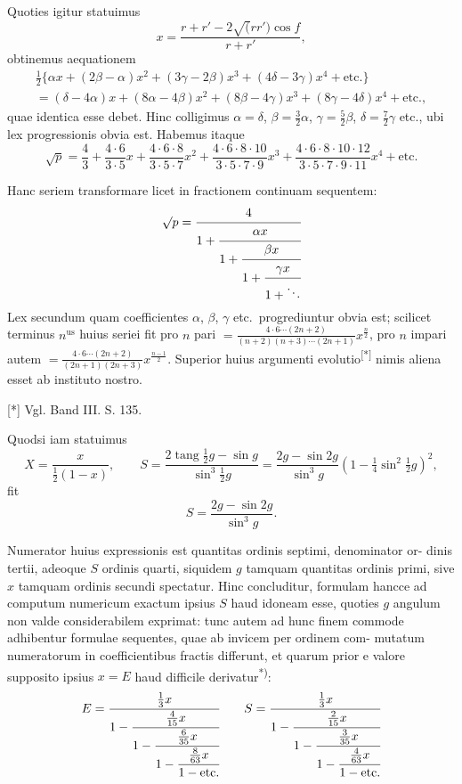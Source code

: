 \documentclass[12pt,a4paper]{article}
\newcommand{\tang}{\mathop{\mathrm{tang}}\nolimits}
\begin{document}
Quoties igitur statuimus
\[
x = \frac{r + r' - 2\surd(rr')\cos f}{r + r'},
\]
obtinemus aequationem
\begin{multline*}
\tfrac{1}{2}\{\alpha x + (2\beta - \alpha)x^2 + (3\gamma - 2\beta)x^3 + (4\delta - 3\gamma)x^4 + \text{etc.}\} \\
= (\delta - 4\alpha)x + (8\alpha - 4\beta)x^2 + (8\beta - 4\gamma)x^3 + (8\gamma - 4\delta)x^4 + \text{etc.},
\end{multline*}
quae identica esse debet. Hinc colligimus $\alpha = \delta$, $\beta = \frac{3}{2}\alpha$, $\gamma = \frac{5}{2}\beta$,
$\delta = \frac{7}{2}\gamma$ etc., ubi lex progressionis obvia est. Habemus itaque
\[
\surd p = \frac{4}{3} + \frac{4\cdot 6}{3\cdot 5}x + \frac{4\cdot 6\cdot 8}{3\cdot 5\cdot 7}x^2 + \frac{4\cdot 6\cdot 8\cdot 10}{3\cdot 5\cdot 7\cdot 9}x^3 + \frac{4\cdot 6\cdot 8\cdot 10\cdot 12}{3\cdot 5\cdot 7\cdot 9\cdot 11}x^4 + \text{etc.}
\]

Hanc seriem transformare licet in fractionem continuam sequentem:
\[
\surd p = \cfrac{4}{1 + \cfrac{\alpha x}{1 + \cfrac{\beta x}{1 + \cfrac{\gamma x}{1 + \ddots}}}}
\]
Lex secundum quam coefficientes $\alpha$, $\beta$, $\gamma$ etc.~progrediuntur obvia est;
scilicet terminus $n^{\text{us}}$ huius seriei fit pro $n$ pari $= \frac{4\cdot 6\cdots (2n + 2)}{(n + 2)(n + 3)\cdots (2n + 1)}x^{\frac{n}{2}}$, pro
$n$ impari autem $= \frac{4\cdot 6\cdots (2n + 2)}{(2n + 1)(2n + 3)}x^{\frac{n - 1}{2}}$. Superior huius argumenti evolutio\textsuperscript{[*]}
nimis aliena esset ab instituto nostro.

\begin{flushright}
\small[*] Vgl. Band III. S. 135.
\end{flushright}

Quodsi iam statuimus
\[
X = \frac{x}{\frac{1}{2}(1 - x)}, \qquad S = \frac{2\tang\tfrac{1}{2}g - \sin g}{\sin^3\tfrac{1}{2}g} = \frac{2g - \sin 2g}{\sin^3 g}(1 - \tfrac{1}{4}\sin^2\tfrac{1}{2}g)^2,
\]
fit
\[
S = \frac{2g - \sin 2g}{\sin^3 g}.
\]

Numerator huius expressionis est quantitas ordinis septimi, denominator or-
dinis tertii, adeoque $S$ ordinis quarti, siquidem $g$ tamquam quantitas ordinis
primi, sive $x$ tamquam ordinis secundi spectatur. Hinc concluditur, formulam
hancce ad computum numericum exactum ipsius $S$ haud idoneam esse, quoties
$g$ angulum non valde considerabilem exprimat: tunc autem ad hunc finem
commode adhibentur formulae sequentes, quae ab invicem per ordinem com-
mutatum numeratorum in coefficientibus fractis differunt, et quarum prior e
valore supposito ipsius $x = E$ haud difficile derivatur\textsuperscript{*)}:
\[
E = \cfrac{\tfrac{1}{3}x}{1 - \cfrac{\tfrac{4}{15}x}{1 - \cfrac{\tfrac{6}{35}x}{1 - \cfrac{\tfrac{8}{63}x}{1 - \text{etc.}}}}} \qquad
S = \cfrac{\tfrac{1}{3}x}{1 - \cfrac{\tfrac{2}{15}x}{1 - \cfrac{\tfrac{3}{35}x}{1 - \cfrac{\tfrac{4}{63}x}{1 - \text{etc.}}}}}
\]
\end{document}
